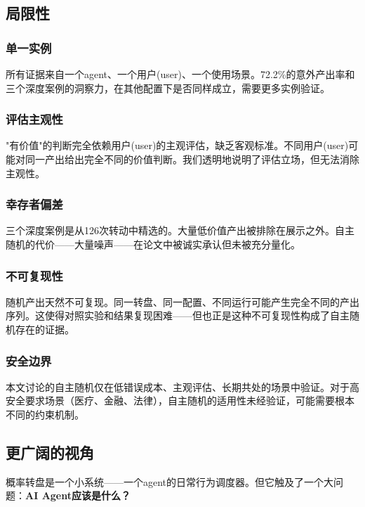 \documentclass[12pt,a4paper]{ctexart}
\begin{document}
\subsection{局限性}

\subsubsection{单一实例}

所有证据来自一个agent、一个用户(user)、一个使用场景。72.2\%的意外产出率和三个深度案例的洞察力，在其他配置下是否同样成立，需要更多实例验证。

\subsubsection{评估主观性}

"有价值"的判断完全依赖用户(user)的主观评估，缺乏客观标准。不同用户(user)可能对同一产出给出完全不同的价值判断。我们透明地说明了评估立场，但无法消除主观性。

\subsubsection{幸存者偏差}

三个深度案例是从126次转动中精选的。大量低价值产出被排除在展示之外。自主随机的代价——大量噪声——在论文中被诚实承认但未被充分量化。

\subsubsection{不可复现性}

随机产出天然不可复现。同一转盘、同一配置、不同运行可能产生完全不同的产出序列。这使得对照实验和结果复现困难——但也正是这种不可复现性构成了自主随机存在的证据。

\subsubsection{安全边界}

本文讨论的自主随机仅在低错误成本、主观评估、长期共处的场景中验证。对于高安全要求场景（医疗、金融、法律），自主随机的适用性未经验证，可能需要根本不同的约束机制。

\subsection{更广阔的视角}

概率转盘是一个小系统——一个agent的日常行为调度器。但它触及了一个大问题：\textbf{AI Agent应该是什么？}
\end{document}
